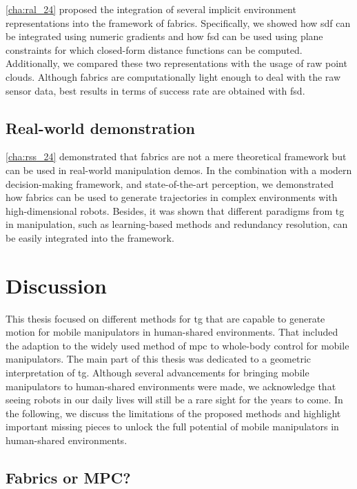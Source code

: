 \cref{cha:ral_24} proposed the integration of several implicit environment
representations into the framework of \ac{fabrics}. Specifically, we showed how
\ac{sdf} can be integrated using numeric gradients and how \ac{fsd} can be
used using plane constraints for which closed-form distance functions can be
computed. Additionally, we compared these two representations with the usage of
raw point clouds. Although \ac{fabrics} are computationally light enough to deal
with the raw sensor data, best results in terms of success rate are obtained
with \ac{fsd}.

\subsection{Real-world demonstration}
\label{sec:conclusion_real_world}

\cref{cha:rss_24} demonstrated that \ac{fabrics} are not a mere theoretical
framework but can be used in real-world manipulation demos. In the combination
with a modern decision-making framework, and state-of-the-art perception, 
we demonstrated how \ac{fabrics} can be used to generate trajectories in complex
environments with high-dimensional robots. Besides, it was shown that different
paradigms from \ac{tg} in manipulation, such as learning-based methods and
redundancy resolution, can be easily integrated into the framework.

\section{Discussion}
\label{sec:discussion}

This thesis focused on different methods for \ac{tg} that are capable to
generate motion for mobile manipulators in human-shared environments. That
included the adaption to the widely used method of \ac{mpc}
to whole-body control for mobile
manipulators. The main part of this thesis was dedicated to a geometric
interpretation of \ac{tg}. Although several advancements for bringing mobile
manipulators to human-shared environments were made, we acknowledge
that seeing robots in our daily lives will still be a rare sight for the years
to come. In the following, we discuss the limitations of the proposed methods
and highlight important missing pieces to unlock the full potential of mobile
manipulators in human-shared environments.

\subsection{Fabrics or MPC?}
\label{sec:discussion_fabrics_or_mpc}

